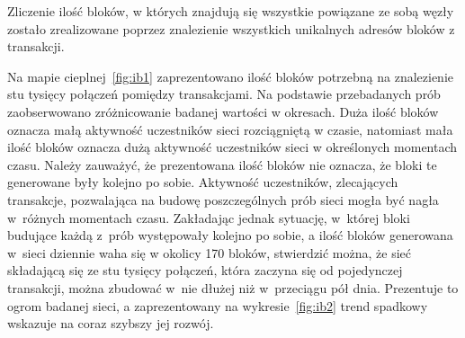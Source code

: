 \documentclass[12pt, oneside, final, openany]{mgr}
\begin{document}
\indent Zliczenie ilość bloków, w których znajdują się wszystkie powiązane ze sobą węzły zostało zrealizowane poprzez znalezienie wszystkich unikalnych adresów bloków z transakcji.

\indent Na mapie cieplnej~\ref{fig:ib1} zaprezentowano ilość bloków potrzebną na znalezienie stu tysięcy połączeń pomiędzy transakcjami. Na podstawie przebadanych prób zaobserwowano zróżnicowanie badanej wartości w okresach. Duża ilość bloków oznacza małą aktywność uczestników sieci rozciągniętą w czasie, natomiast mała ilość bloków oznacza dużą aktywność uczestników sieci w określonych momentach czasu. Należy zauważyć, że prezentowana ilość bloków nie oznacza, że bloki te generowane były kolejno po sobie. Aktywność uczestników, zlecających transakcje, pozwalająca na budowę poszczególnych prób sieci mogła być nagła w~różnych momentach czasu. Zakładając jednak sytuację, w~której bloki budujące każdą z~prób występowały kolejno po sobie, a ilość bloków generowana w~sieci dziennie waha się w okolicy 170 bloków, stwierdzić można, że sieć składającą się ze stu tysięcy połączeń, która zaczyna się od pojedynczej transakcji, można zbudować w~nie dłużej niż w~przeciągu pół dnia. Prezentuje to ogrom badanej sieci, a zaprezentowany na wykresie~\ref{fig:ib2} trend spadkowy wskazuje na coraz szybszy jej rozwój. 
\end{document}
